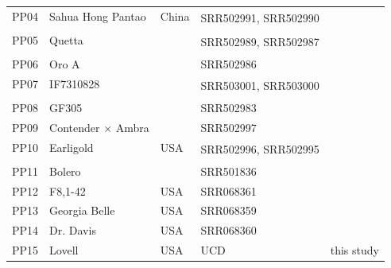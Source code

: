 \documentclass[12pt]{article}
\begin{document}
\begin{center}
\begin{longtable}{lllll}
                 \\
                 PP04 &Sahua Hong Pantao &China &\multirow{2}{1cm}{SRR502991, SRR502990} &\citealt{verde2013high}\\
                 \\
                 PP05 &Quetta & &\multirow{2}{1cm}{SRR502989, SRR502987} &\citealt{verde2013high}\\
                 \\
                 PP06 &Oro A & &SRR502986 &\citealt{verde2013high}\\
                 PP07 &IF7310828 & &\multirow{2}{1cm}{SRR503001, SRR503000} &\citealt{verde2013high}\\
                 \\
                 PP08 &GF305 & &SRR502983 &\citealt{verde2013high}\\
                 PP09 &Contender $\times$ Ambra & &SRR502997 &\citealt{verde2013high}\\
                 PP10 &Earligold &USA &\multirow{2}{1cm}{SRR502996, SRR502995} &\citealt{verde2013high}\\
                 \\
                 PP11 &Bolero & &SRR501836 &\citealt{verde2013high}\\
                 PP12 &F8,1-42 &USA &SRR068361 &\citealt{ahmad2011whole} \\
                 PP13 &Georgia Belle &USA &SRR068359 &\citealt{ahmad2011whole} \\
                 PP14 &Dr. Davis &USA &SRR068360 &\citealt{ahmad2011whole} \\
                 PP15 &Lovell &USA &UCD &this study\\

\end{longtable}
\end{center}
\end{document}
